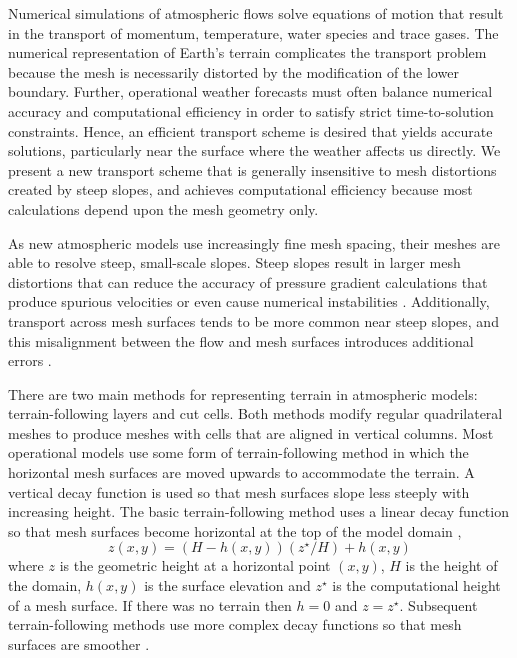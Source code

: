 Numerical simulations of atmospheric flows solve equations of motion that result in the transport of momentum, temperature, water species and trace gases.  The numerical representation of Earth's terrain complicates the transport problem because the mesh is necessarily distorted by the modification of the lower boundary.  Further, operational weather forecasts must often balance numerical accuracy and computational efficiency in order to satisfy strict time-to-solution constraints.  Hence, an efficient transport scheme is desired that yields accurate solutions, particularly near the surface where the weather affects us directly.
We present a new transport scheme that is generally insensitive to mesh distortions created by steep slopes, and achieves computational efficiency because most calculations depend upon the mesh geometry only.

As new atmospheric models use increasingly fine mesh spacing, their meshes are able to resolve steep, small-scale slopes.  Steep slopes result in larger mesh distortions that can reduce the accuracy of pressure gradient calculations \citep{klemp2011} that produce spurious velocities or even cause numerical instabilities \citep{webster2003}.  Additionally, transport across mesh surfaces tends to be more common near steep slopes, and this misalignment between the flow and mesh surfaces introduces additional errors \citep{schaer2002,shaw-weller2016}.


There are two main methods for representing terrain in atmospheric models: terrain-following layers and cut cells.  Both methods modify regular quadrilateral meshes to produce meshes with cells that are aligned in vertical columns.  Most operational models use some form of terrain-following method in which the horizontal mesh surfaces are moved upwards to accommodate the terrain.  A vertical decay function is used so that mesh surfaces slope less steeply with increasing height.  The basic terrain-following method uses a linear decay function so that mesh surfaces become horizontal at the top of the model domain \citep{galchen-somerville1975},
\begin{equation}
	z(x,y) = \left( H - h(x,y) \right) \left( z^\star / H \right) + h(x,y) \label{eqn:btf}
\end{equation}
where $z$ is the geometric height at a horizontal point $(x, y)$, $H$ is the height of the domain, $h(x,y)$ is the surface elevation and $z^\star$ is the computational height of a mesh surface.  If there was no terrain then $h = 0$ and $z = z^\star$.
Subsequent terrain-following methods use more complex decay functions so that mesh surfaces are smoother \citep{simmons-burridge1981,schaer2002,leuenberger2010,klemp2011}.


